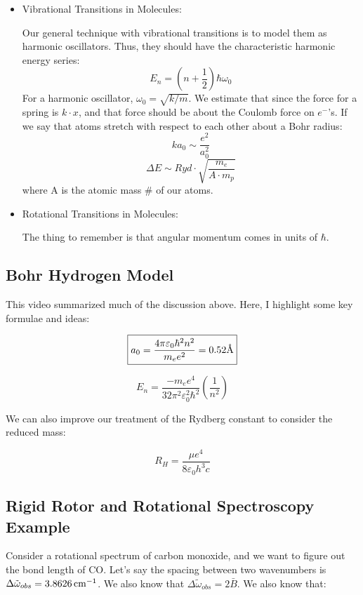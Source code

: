 \documentclass{article}
\newcommand{\unit}[1]{{\,\rm #1}}
\newcommand{\cm}{\unit{cm}}
\newcommand{\angstrom}{\mbox{\normalfont\AA}}
\begin{document}
\begin{itemize}
\item  Vibrational Transitions in Molecules:\par
Our general technique with vibrational transitions is to model them as
harmonic oscillators.  Thus, they should have the characteristic harmonic
energy series:
$$E_n=(n+\frac12)\hbar\omega_0$$
For a harmonic oscillator, $\omega_0=\sqrt{k/ m}$.  We estimate that since
the force for a spring is $k\cdot x$, and that force should be about the 
Coulomb force on $e^-$'s.  If we say that atoms stretch with respect to
each other about a Bohr radius:
$$ka_0\sim\frac{e^2}{a_0^2}$$
$$\Delta E \sim Ryd\cdot\sqrt{\frac{m_e}{A\cdot m_p}}$$
where A is the atomic mass \# of our atoms.

\item  Rotational Transitions in Molecules:\par
The thing to remember is that angular momentum comes in units of $\hbar$.
\end{itemize}

\subsection{Bohr Hydrogen Model}

This video summarized much of the discussion above. Here, I highlight some key formulae and ideas:

\begin{equation}
    \boxed{a_0 = \frac{4 \pi \varepsilon_0 \hbar^2 n^2}{m_e e^2} = 0.52 \angstrom}
\end{equation}

\begin{equation}
    \boxed{E_n = \frac{- m_e e^4}{32 \pi^2 \varepsilon_0^2 \hbar^2} \left(\frac{1}{n^2}\right)}
\end{equation}

We can also improve our treatment of the Rydberg constant to consider the reduced mass:

\begin{equation}
    \boxed{R_H = \frac{\mu e^4}{8 \varepsilon_0 h^3 c}}
\end{equation}

\subsection{Rigid Rotor and Rotational Spectroscopy Example}

Consider a rotational spectrum of carbon monoxide, and we want to figure out the bond length of CO. Let's say the spacing between two wavenumbers is $\Delta \tilde{\omega}_{obs} = 3.8626 \cm^{-1}$. We also know that $\Delta \tilde{\omega}_{obs} = 2\bar{B}$. We also know that:
\end{document}
